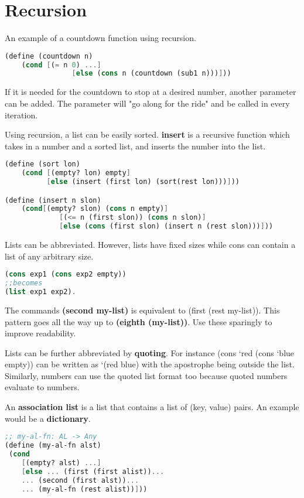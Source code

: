 \documentclass[english, 12pt]{article}
\begin{document}
\section{Recursion}
\begin{exmp}
An example of a countdown function using recursion.
\begin{lstlisting}[language=Scheme]
(define (countdown n)
	(cond [(= n 0) ...]
		 		[else (cons n (countdown (sub1 n)))]))
\end{lstlisting}
If it is needed for the countdown to stop at a desired number, another parameter can be added. The parameter will "go along for the ride" and be called in every iteration.
\end{exmp}
\begin{exmp}
Using recursion, a list can be easily sorted. \textbf{insert} is a recursive function which takes in a number and a sorted list, and inserts the number into the list.
\begin{lstlisting}[language=Scheme]
(define (sort lon)
	(cond [(empty? lon) empty]
		  [else (insert (first lon) (sort(rest lon)))]))

(define (insert n slon)
	(cond[(empty? slon) (cons n empty)]
			 [(<= n (first slon)) (cons n slon)]
			 [else (cons (first slon) (insert n (rest slon)))]))
\end{lstlisting}
\end{exmp}
\begin{defn}
Lists can be abbreviated. However, lists have fixed sizes while cons can contain a list of any arbitrary size.
\begin{lstlisting}[language=Scheme]
(cons exp1 (cons exp2 empty)) 
;;becomes
(list exp1 exp2).
\end{lstlisting}
\end{defn}
\begin{defn}
The commands \textbf{(second my-list)} is equivalent to (first (rest my-list)). This pattern goes all the way up to \textbf{(eighth (my-list))}. Use these sparingly to improve readability.
\end{defn}
\begin{defn}
Lists can be further abbreviated by \textbf{quoting}. For instance (cons `red (cons `blue empty)) can be written as `(red blue) with the apostrophe being outside the list. Similarly, numbers can use the quoted list format too because quoted numbers evaluate to numbers.
\end{defn}
\begin{defn}[AL]
An \textbf{association list} is a list that contains a list of (key, value) pairs. An example would be a \textbf{dictionary}.
\begin{lstlisting}[language=Scheme]
;; my-al-fn: AL -> Any
(define (my-al-fn alst)
 (cond 
 	[(empty? alst) ...]
 	[else ... (first (first alist))...
 	... (second (first alst))...
 	... (my-al-fn (rest alist))]))
\end{lstlisting}
\end{defn}
\end{document}
